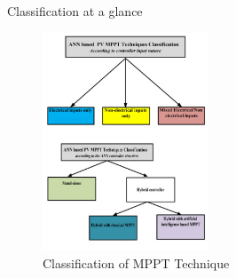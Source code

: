 \documentclass[10pt]{beamer}
\begin{document}
\begin{frame}{Classification at a glance}
	\begin{figure}
    	\centering
        \includegraphics[width=.6\linewidth, height=6.5cm]{classification.png}
        \caption{Classification of MPPT Technique}
        \label{fig:classification}
    \end{figure}
\end{frame}
\end{document}
